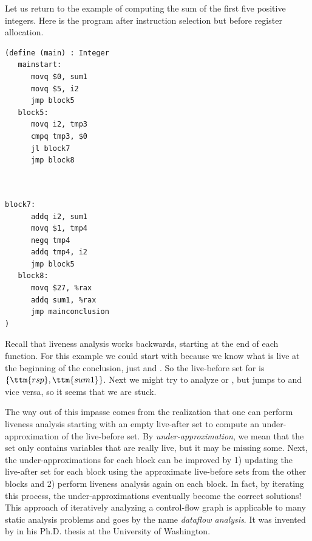 \documentclass[11pt]{book}
\begin{document}
Let us return to the example of computing the sum of the first five
positive integers. Here is the program after instruction selection but
before register allocation.
\begin{center}
\begin{minipage}{0.45\textwidth}
\begin{lstlisting}
(define (main) : Integer
   mainstart:
      movq $0, sum1
      movq $5, i2
      jmp block5
   block5:
      movq i2, tmp3
      cmpq tmp3, $0
      jl block7
      jmp block8
\end{lstlisting}
\end{minipage}
\begin{minipage}{0.45\textwidth}
  \begin{lstlisting}

    
block7:
      addq i2, sum1
      movq $1, tmp4
      negq tmp4
      addq tmp4, i2
      jmp block5
   block8:
      movq $27, %rax
      addq sum1, %rax
      jmp mainconclusion
)
\end{lstlisting}
  \end{minipage}
\end{center}
Recall that liveness analysis works backwards, starting at the end
of each function. For this example we could start with 
because we know what is live at the beginning of the conclusion,
just  and . So the live-before set
for  is $\{\ttm{rsp},\ttm{sum1}\}$.
%
Next we might try to analyze  or , but
 jumps to  and vice versa, so it seems that
we are stuck.

The way out of this impasse comes from the realization that one can
perform liveness analysis starting with an empty live-after set to
compute an under-approximation of the live-before set.  By
\emph{under-approximation}, we mean that the set only contains
variables that are really live, but it may be missing some.  Next, the
under-approximations for each block can be improved by 1) updating the
live-after set for each block using the approximate live-before sets
from the other blocks and 2) perform liveness analysis again on each
block.  In fact, by iterating this process, the under-approximations
eventually become the correct solutions!
%
This approach of iteratively analyzing a control-flow graph is
applicable to many static analysis problems and goes by the name
\emph{dataflow analysis}.  It was invented by
\citet{Kildall:1973vn} in his Ph.D. thesis at the University of
Washington.
\end{document}
